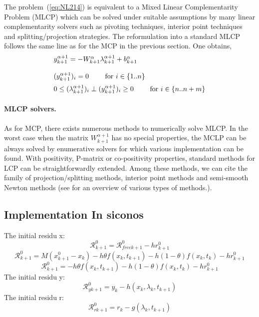 The problem~(\ref{eq:NL214}) is equivalent to a Mixed Linear Complementarity Problem (MLCP) which can be solved under suitable assumptions by many linear complementarity solvers such as pivoting techniques, interior point techniques and splitting/projection strategies. The  reformulation into a standard MLCP follows the same line as for the MCP in the previous section. One obtains,
    \begin{equation}
      \begin{array}[l]{l}
        y^{\alpha+1}_{k+1} =   - W^{\alpha}_{k+1}  \lambda^{\alpha+1}_{k+1} + b^{\alpha}_{k+1}
        \\ \\
        (y^{\alpha+1}_{k+1})_i  = 0 \qquad \textrm{ for } i \in \{ 1..n\}\\[2mm]
        0 \leq  (\lambda^{\alpha+1}_{k+1})_i\perp (y^{\alpha+1}_{k+1})_i \geq 0 \qquad \textrm{ for } i \in \{ n..n+m\}\\
      \end{array}
      \label{eq:MLCP1} 
    \end{equation}

\paragraph{MLCP solvers.} As for MCP, there exists numerous methods to numerically solve MLCP. In the worst case when the matrix $W^{\alpha+1}_{k+1}$ has no special properties, the MCLP can be always solved by enumerative solvers for which various implementation can be found. With positivity, P-matrix  or co-positivity properties, standard methods for LCP\cite{Cottle.Pang.ea1992} can be straightforwardly extended. Among these methods, we can cite the family of projection/splitting methods, interior point methods and semi-smooth Newton methods (see \cite{acary2008} for an overview of various types of methods.).

\subsection{Implementation In siconos}

The initial residu x:
\[\mathcal   R^{0}_{k+1}= \mathcal   R^{0}_{free k+1}-hr^{0}_{k+1}\]
\[\mathcal   R^{0}_{k+1}= M(x^{0}_{k+1} - x_k) -h\theta f(x_k,t_{k+1})-h(1-\theta)f(x_k,t_k)-hr^{0}_{k+1}\]
\[\mathcal   R^{0}_{k+1}= -h\theta f(x_k,t_{k+1})-h(1-\theta)f(x_k,t_k)-hr^{0}_{k+1}\]
The initial residu y:
\[\mathcal   R^{0}_{y k+1} =y_k -h(x_k,\lambda _k,t_{k+1})\]
The initial residu r:
\[\mathcal   R^{0}_{r k+1} =r_k -g(\lambda _k,t_{k+1})\]


